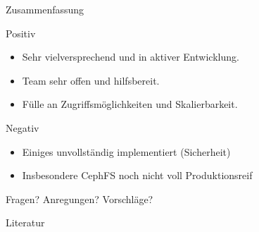 \documentclass[hyperref={xetex}]{beamer}
\begin{document}
\begin{frame}[fragile]{Zusammenfassung}
  \begin{block}{Positiv}
\begin{itemize}
	\item Sehr vielversprechend und in aktiver Entwicklung.
\item Team sehr offen und hilfsbereit.
\item Fülle an Zugriffsmöglichkeiten und Skalierbarkeit.
    \end{itemize}
  \end{block}
  \begin{block}{Negativ}
\begin{itemize}
	\item Einiges unvollst\"andig implementiert (Sicherheit)
  \item Insbesondere CephFS noch nicht voll Produktionsreif
\end{itemize}
  \end{block}
	\begin{center}
	\large Fragen? Anregungen? Vorschl\"age? 
	\end{center}
\end{frame}

	

\begin{frame}{Literatur}
	
		
\end{frame}
\end{document}
